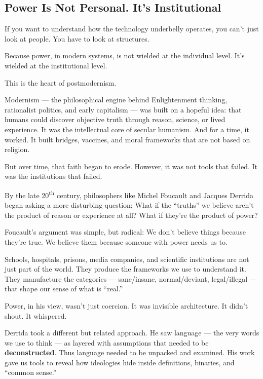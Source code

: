 \subsection{Power Is Not Personal. It’s Institutional}

If you want to understand how the technology underbelly operates, you can’t just look at people.  
You have to look at structures.

Because power, in modern systems, is not wielded at the individual level.  
It’s wielded at the institutional level.

This is the heart of postmodernism.

Modernism — the philosophical engine behind Enlightenment thinking, rationalist politics, and early capitalism — was built 
on a hopeful idea:  
that humans could discover objective truth through reason, science, or lived experience.  
It was the intellectual core of secular humanism.  
And for a time, it worked. It built bridges, vaccines, and moral frameworks that are not based on religion.

But over time, that faith began to erode. However, it was not tools that failed. It was the institutions that failed.

By the late 20\textsuperscript{th} century, philosophers like Michel Foucault and Jacques Derrida began asking a more 
disturbing question:  
What if the “truths” we believe aren’t the product of reason or experience at all?  
What if they’re the product of power?

Foucault’s argument was simple, but radical:  
We don’t believe things because they’re true.  
We believe them because someone with power needs us to.

Schools, hospitals, prisons, media companies, and scientific institutions are not just part of the world.  
They produce the frameworks we use to understand it. They manufacture the categories --- sane/insane, normal/deviant, 
legal/illegal --- that shape our sense of what is “real.”

Power, in his view, wasn’t just coercion. It was invisible architecture.  
It didn’t shout. It whispered.

Derrida took a different but related approach.  
He saw language --- the very words we use to think --- as layered with assumptions that needed to be \textbf{deconstructed}.  
Thus language needed to be unpacked and examined.  
His work gave us tools to reveal how ideologies hide inside definitions, binaries, and ``common sense.''

